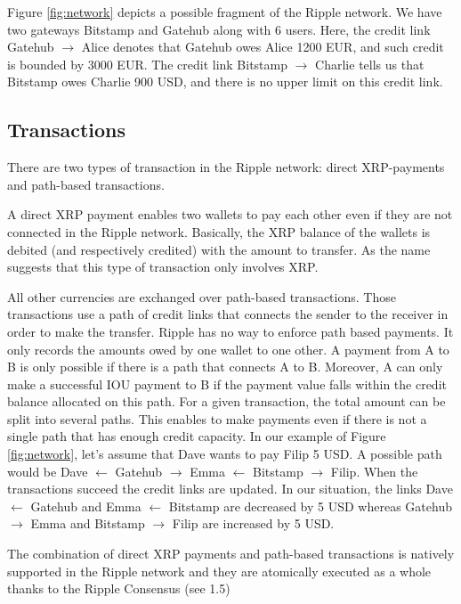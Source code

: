 Figure \ref{fig:network} depicts a possible fragment of the Ripple network. We have two gateways Bitstamp and Gatehub along with 6 users. Here, the credit link Gatehub $\rightarrow$ Alice denotes that Gatehub owes Alice 1200 EUR, and such credit is bounded by 3000 EUR. The credit link Bitstamp $\rightarrow$ Charlie tells us that Bitstamp owes Charlie 900 USD, and there is no upper limit on this credit link.

\subsection{Transactions}
There are two types of transaction in the Ripple network: direct XRP-payments and path-based transactions.

A direct XRP payment enables two wallets to pay each other even if they are not connected in the Ripple network. Basically, the XRP balance of the wallets is debited (and respectively credited) with the amount to transfer. As the name suggests that this type of transaction only involves XRP. 

All other currencies are exchanged over path-based transactions. Those transactions use a path of credit links that connects the sender to the receiver in order to make the transfer. Ripple has no way to enforce path based payments. It only records the amounts owed by one wallet to one other. A payment from A to B is only possible if there is a path that connects A to B. Moreover, A can only make a successful IOU payment to B if the payment value falls within the credit balance allocated on this path. For a given transaction, the total amount can be split into several paths. This enables to make payments even if there is not a single path that has enough credit capacity. In our example of Figure \ref{fig:network}, let's assume that Dave wants to pay Filip 5 USD. A possible path would be Dave $\leftarrow$ Gatehub $\rightarrow$ Emma $\leftarrow$ Bitstamp $\rightarrow$ Filip. When the transactions succeed the credit links are updated. In our situation, the links Dave $\leftarrow$ Gatehub and Emma $\leftarrow$ Bitstamp are decreased by 5 USD whereas Gatehub $\rightarrow$ Emma and Bitstamp $\rightarrow$ Filip are increased by 5 USD.

The combination of direct XRP payments and path-based transactions is natively supported in the Ripple network and they are atomically executed as a whole thanks to the Ripple Consensus (see 1.5)

